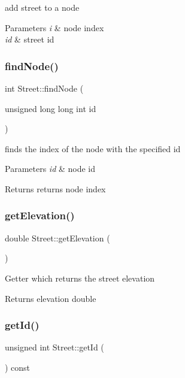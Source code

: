 add street to a node 
\begin{DoxyParams}{Parameters}
{\em i} & node index \\
\hline
{\em id} & street id \\
\hline
\end{DoxyParams}
\mbox{\label{class_street_aa35e1a8c37690c9463edc97a1d0fe60e}} 
\subsubsection{\texorpdfstring{find\+Node()}{findNode()}}
{\footnotesize\ttfamily int Street\+::find\+Node (\begin{DoxyParamCaption}\item[{unsigned long long int}]{id }\end{DoxyParamCaption})}

finds the index of the node with the specified id 
\begin{DoxyParams}{Parameters}
{\em id} & node id \\
\hline
\end{DoxyParams}
\begin{DoxyReturn}{Returns}
returns node index 
\end{DoxyReturn}
\mbox{\label{class_street_af96504bfc1730a64fec877bb08125460}} 
\subsubsection{\texorpdfstring{get\+Elevation()}{getElevation()}}
{\footnotesize\ttfamily double Street\+::get\+Elevation (\begin{DoxyParamCaption}{ }\end{DoxyParamCaption})}

Getter which returns the street elevation \begin{DoxyReturn}{Returns}
elevation double 
\end{DoxyReturn}
\mbox{\label{class_street_af5bd31425eba6d72a3c81505e720249b}} 
\subsubsection{\texorpdfstring{get\+Id()}{getId()}}
{\footnotesize\ttfamily unsigned int Street\+::get\+Id (\begin{DoxyParamCaption}{ }\end{DoxyParamCaption}) const}

